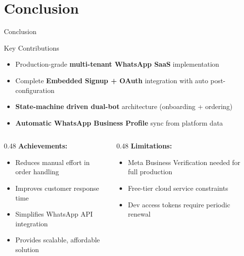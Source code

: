 \documentclass[aspectratio=169]{beamer}
\begin{document}
\section{Conclusion}
\begin{frame}[shrink=5]{Conclusion}

\begin{block}{Key Contributions}
\begin{itemize}
  \item Production-grade \textbf{multi-tenant WhatsApp SaaS} implementation
  \item Complete \textbf{Embedded Signup + OAuth} integration with auto post-configuration
  \item \textbf{State-machine driven dual-bot} architecture (onboarding + ordering)
  \item \textbf{Automatic WhatsApp Business Profile} sync from platform data
\end{itemize}
\end{block}

\vspace{0.2cm}
\begin{columns}[T]
\begin{column}{0.48\textwidth}
\textbf{Achievements:}
\begin{itemize}
  \item Reduces manual effort in order handling
  \item Improves customer response time
  \item Simplifies WhatsApp API integration
  \item Provides scalable, affordable solution
\end{itemize}
\end{column}
\begin{column}{0.48\textwidth}
\textbf{Limitations:}
\begin{itemize}
  \item Meta Business Verification needed for full production
  \item Free-tier cloud service constraints
  \item Dev access tokens require periodic renewal
\end{itemize}
\end{column}
\end{columns}

\end{frame}
\end{document}
